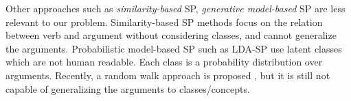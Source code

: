 
Other approaches such as {\em similarity-based} SP\cite{clark2001class,erk2007simple},
{\em generative model-based} SP\cite{Ritter:2010} are less relevant to
our problem. Similarity-based SP
methods focus on the relation between verb and argument without considering 
classes, and cannot generalize the arguments. Probabilistic model-based SP 
such as LDA-SP use latent classes which are not human readable.
 Each class is a probability distribution over arguments. 
Recently, a random walk approach is proposed \cite{Tian13}, 
but it is still not capable of generalizing
the arguments to classes/concepts.

%


